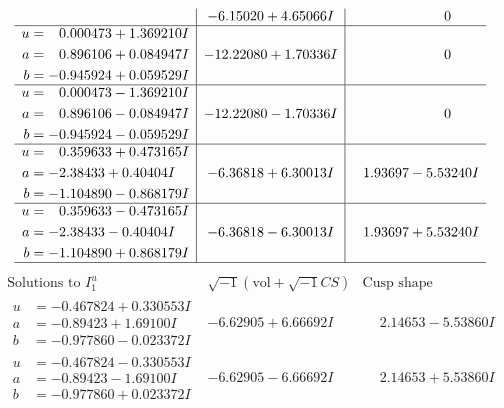 \documentclass[1p]{elsarticle_modified}
\theoremstyle{definition}
\newcommand{\I}{\sqrt{-1}}
\begin{document}
$$\begin{array}{c|c|c}
 & -6.15020 + 4.65066 I & \phantom{-0.000000 } 0 \\ \hline\begin{aligned}
u &= \phantom{-}0.000473 + 1.369210 I \\
a &= \phantom{-}0.896106 + 0.084947 I \\
b &= -0.945924 + 0.059529 I\end{aligned}
 & -12.22080 + 1.70336 I & \phantom{-0.000000 } 0 \\ \hline\begin{aligned}
u &= \phantom{-}0.000473 - 1.369210 I \\
a &= \phantom{-}0.896106 - 0.084947 I \\
b &= -0.945924 - 0.059529 I\end{aligned}
 & -12.22080 - 1.70336 I & \phantom{-0.000000 } 0 \\ \hline\begin{aligned}
u &= \phantom{-}0.359633 + 0.473165 I \\
a &= -2.38433 + 0.40404 I \\
b &= -1.104890 - 0.868179 I\end{aligned}
 & -6.36818 + 6.30013 I & \phantom{-}1.93697 - 5.53240 I \\ \hline\begin{aligned}
u &= \phantom{-}0.359633 - 0.473165 I \\
a &= -2.38433 - 0.40404 I \\
b &= -1.104890 + 0.868179 I\end{aligned}
 & -6.36818 - 6.30013 I & \phantom{-}1.93697 + 5.53240 I\\
 \hline 
 \end{array}$$\newpage$$\begin{array}{c|c|c}  
\text{Solutions to }I^u_{1}& \I (\text{vol} + \sqrt{-1}CS) & \text{Cusp shape}\\
 \hline 
\begin{aligned}
u &= -0.467824 + 0.330553 I \\
a &= -0.89423 + 1.69100 I \\
b &= -0.977860 - 0.023372 I\end{aligned}
 & -6.62905 + 6.66692 I & \phantom{-}2.14653 - 5.53860 I \\ \hline\begin{aligned}
u &= -0.467824 - 0.330553 I \\
a &= -0.89423 - 1.69100 I \\
b &= -0.977860 + 0.023372 I\end{aligned}
 & -6.62905 - 6.66692 I & \phantom{-}2.14653 + 5.53860 I \\ \hline\begin{aligned}

\end{aligned}
\end{array}$$
\end{document}
